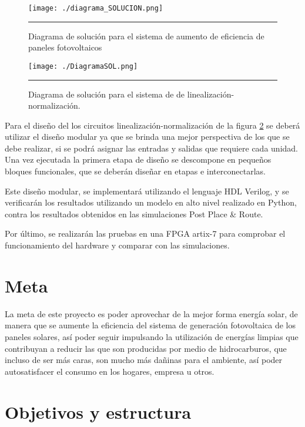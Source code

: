 \begin{figure}[H]
  \centering
    \texttt{[image: ./diagrama\_SOLUCION.png]}
    \rule{35em}{0.5pt}
  \caption[Diagrama de solución para el sistema de aumento de eficiencia de paneles fotovoltaicos]{ Diagrama de solución para el sistema de aumento de eficiencia de paneles fotovoltaicos}
  \label{fig:DSOL}
\end{figure}

\begin{figure}[H]
  \centering
    \texttt{[image: ./DiagramaSOL.png]}
    \rule{35em}{0.5pt}
  \caption[Diagrama de solución para el sistema de linealización-normalización.]{ Diagrama de solución para el sistema de de linealización-normalización.}
  \label{fig:DiagramaSOL}
\end{figure}

Para el diseño del los circuitos linealización-normalización de la figura \ref{fig:DiagramaSOL} se deberá utilizar el diseño modular ya que se brinda una mejor perspectiva de los que se debe realizar, si se podrá asignar las entradas y salidas que requiere cada unidad. Una vez ejecutada la primera etapa de diseño se descompone en pequeños bloques funcionales, que se deberán diseñar en etapas e interconectarlas.   

Este diseño modular, se implementará utilizando el lenguaje HDL Verilog, y se verificarán los resultados utilizando un modelo en alto nivel realizado en Python, contra los resultados obtenidos en las simulaciones Post Place \& Route.

Por último, se realizarán las pruebas en una FPGA artix-7 para comprobar el funcionamiento del hardware y comparar con las simulaciones. 

\section{Meta}

La meta de este proyecto es poder aprovechar de la mejor forma energía solar, de manera que se aumente la eficiencia del sistema de generación fotovoltaica de los paneles solares, así poder seguir impulsando la utilización de energías limpias que contribuyan a reducir las que son producidas por medio de hidrocarburos, que incluso de ser más caras, son mucho más dañinas para el ambiente, así poder autosatisfacer el consumo en los hogares, empresa u otros. 

\section{Objetivos y estructura}

